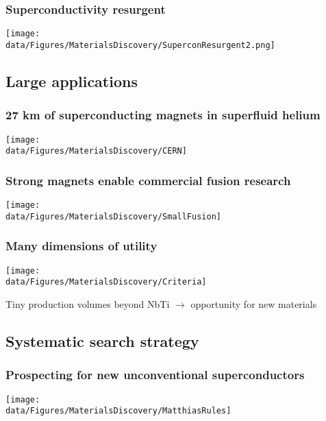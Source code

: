 \begin{emptyframe}
  \frametitle{Superconductivity resurgent}
  \centerline{\texttt{[image: \\data/Figures/MaterialsDiscovery/SuperconResurgent2.png]}}  
\end{emptyframe}
{}


\subsection{Large applications}
\begin{frame}[label=Collider]
\frametitle{27 km of superconducting magnets in superfluid helium}
\centerline{\texttt{[image: \\data/Figures/MaterialsDiscovery/CERN]}}

\end{frame}

    
    
\begin{frame}[label=CommercialFusion]
    \frametitle{Strong magnets enable commercial fusion research}
    \centerline{\texttt{[image: \\data/Figures/MaterialsDiscovery/SmallFusion]}}
    
\end{frame}

\begin{frame}[label=Useful properties]
    \frametitle{Many dimensions of utility}
    \centerline{\texttt{[image: \\data/Figures/MaterialsDiscovery/Criteria]}}
    \centerline{\small Tiny production volumes beyond NbTi $\rightarrow$ opportunity for new materials}
\end{frame}


\subsection{Systematic search strategy}
\begin{frame}[label=NewSupercon]
    \frametitle{Prospecting for new unconventional superconductors}
    \centerline{\texttt{[image: \\data/Figures/MaterialsDiscovery/MatthiasRules]}}
\end{frame}

